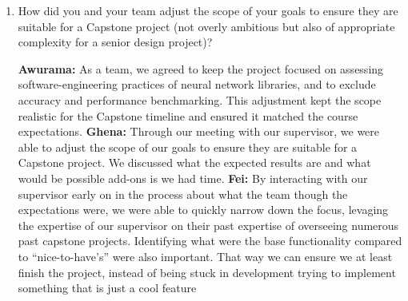 \documentclass{article}
\begin{document}
\begin{enumerate}
    \item How did you and your team adjust the scope of your goals to ensure
    they are suitable for a Capstone project (not overly ambitious but also of
    appropriate complexity for a senior design project)?

    \textbf{Awurama:} As a team, we agreed to keep the project focused on assessing 
    software-engineering practices of neural network libraries, and to exclude accuracy 
    and performance benchmarking. This adjustment kept the scope realistic for the 
    Capstone timeline and ensured it matched the course expectations.  
    \textbf{Ghena:} Through our meeting with our supervisor, we were able to adjust the scope of our goals to ensure they are suitable for a Capstone project. We discussed what the expected results are and what would be possible add-ons is we had time.
    \textbf{Fei:} By interacting with our supervisor early on in the process about what the team though the expectations were, we were able to quickly narrow down the focus, levaging the expertise of our supervisor on their past expertise of overseeing numerous past capstone projects. Identifying what were the base functionality compared to “nice-to-have’s” were also important. That way we can ensure we at least finish the project, instead of being stuck in development trying to implement something that is just a cool feature
\end{enumerate}  
\end{document}
